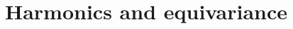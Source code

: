 \documentclass{article} %
\newcommand{\1}{\b{1}}              %
\newcommand{\0}{\b{0}}              %
\newcommand{\todo}[1]{{\color[rgb]{.6,.1,.6}{#1}}}
\begin{document}











\section{Harmonics and equivariance}

\end{document}
